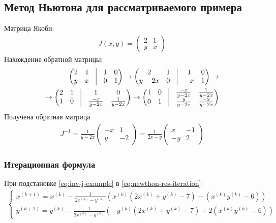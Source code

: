 \subsection{Метод Ньютона для рассматриваемого примера}
Матрица Якоби:
\begin{align}
	J(x,y) = \begin{pmatrix}
		         2 & 1 \\
		         y & x
	         \end{pmatrix}
\end{align}
Нахождение обратной матрицы:
\begin{align*}
	\begin{pmatrix}
		2 & 1 & \vrule & 1 & 0 \\
		y & x & \vrule & 0 & 1
	\end{pmatrix} \to \begin{pmatrix}
		                  2      & 1 & \vrule & 1  & 0 \\
		                  y - 2x & 0 & \vrule & -x & 1
	                  \end{pmatrix} \to \\
	\to \begin{pmatrix}
		    2 & 1 & \vrule & 1                 & 0                \\
		    1 & 0 & \vrule & \frac{-x}{y - 2x} & \frac{1}{y - 2x}
	    \end{pmatrix}
	\to
	\begin{pmatrix}
		1 & 0 & \vrule & \frac{-x}{y - 2x} & \frac{1}{y - 2x}  \\
		0 & 1 & \vrule & \frac{y}{y - 2x}  & \frac{-2}{y - 2x}
	\end{pmatrix}
\end{align*}
Получена обратная матрица
\begin{align}\label{eq:inv-j-example}
	J^{-1} = \frac{1}{y - 2x} \begin{pmatrix}
		                          -x & 1  \\
		                          y  & -2
	                          \end{pmatrix} = \frac{1}{2x-y}\begin{pmatrix}
		                                                        x  & -1 \\
		                                                        -y & 2
	                                                        \end{pmatrix}
\end{align}

\subsubsection*{Итерационная формула}
При подстановке \cref{eq:inv-j-example} в \cref{eq:newthon-res-iteration}:
\begin{align}
	\begin{cases}
		x^{(k + 1)} = x^{(k)} - \frac{1}{2 x^{(k)} - y^{(k)}}(x^{(k)}(2x^{(k)}+y^{(k)}-7)-(x^{(k)}y^{(k)} - 6)) \\
		y^{(k+1)} = y^{(k)} - \frac{1}{2 x^{(k)} - y^{(k)}}(-y^{(k)}(2x^{(k)}+y^{(k)}-7)+2(x^{(k)}y^{(k)} - 6))
	\end{cases}
\end{align}

